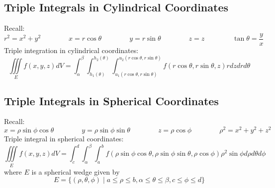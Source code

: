 \documentclass{article}
\begin{document}
    \subsection{Triple Integrals in Cylindrical Coordinates}
    \begin{outline}
        \1 Recall: \[r^2=x^2+y^2\qquad\qquad x=r\cos\theta\qquad\qquad y=r\sin\theta\qquad\qquad z=z\qquad\qquad\tan\theta=\dfrac{y}{x}\]
        \1 Triple integration in cylindrical coordinates: \[\iiint\limits_Ef(x,y,z)dV=\int_\alpha^\beta\int_{h_1(\theta)}^{h_2(\theta)}\int_{u_1(r\cos\theta,r\sin\theta)}^{u_2(r\cos\theta,r\sin\theta)}f(r\cos\theta,r\sin\theta,z)rdzdrd\theta\]

    \end{outline}
    \subsection{Triple Integrals in Spherical Coordinates}
    \begin{outline}
        \1 Recall: \[x=\rho\sin\phi\cos\theta\qquad\qquad y=\rho\sin\phi\sin\theta\qquad\qquad z=\rho\cos\phi \qquad\qquad\rho^2=x^2+y^2+z^2\]
        \1 Triple integral in spherical coordinates: \[\iiint\limits_Ef(x,y,z)dV=\int^d_c\int^\beta_\alpha\int^b_af(\rho\sin\phi\cos\theta,\rho\sin\phi\sin\theta,\rho\cos\phi)\rho^2\sin\phi d\rho d\theta d\phi\] where $E$ is a spherical wedge given by \[E=\{(\rho,\theta,\phi)\;|\; a\leq\rho\leq b,\alpha\leq\theta\leq\beta, c\leq\phi\leq d\}\]

    \end{outline}
\end{document}
